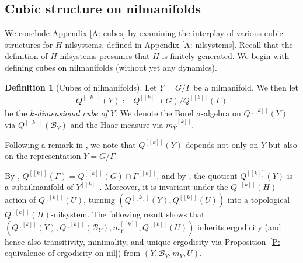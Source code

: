 \documentclass[11pt]{amsart}
\theoremstyle{definition}
\newtheorem{definition}[lemma]{Definition}
\newcommand{\CB}{{\mathcal B}}
\newcommand{\cube}[1]{{[\![#1]\!]}}
\newcommand{\1}{{\mathbf{1}}}
\begin{document}
\subsection{Cubic structure on nilmanifolds}
We conclude Appendix \ref{A: cubes} by examining the interplay of various cubic structures for $H$-nilsystems, defined in Appendix \ref{A: nilsystems}. Recall that the definition of $H$-nilsystems presumes that $H$ is finitely generated. We begin with defining cubes on nilmanifolds (without yet any dynamics).
\begin{definition}[Cubes of nilmanifolds]\label{D: cubes of nilmanifolds}
    Let $Y=G/\Gamma$ be a nilmanifold. 
    We then let
     \begin{align*}
    Q^{\cube{k}}(Y):=Q^{\cube{k}}(G)/Q^{\cube{k}}(\Gamma)    
    \end{align*}
     be the \textit{$k$-dimensional cube of $Y$}. We denote the Borel $\sigma$-algebra on $Q^\cube{k}(Y)$ via $Q^\cube{k}(\CB_Y)$
     and the Haar measure via $m_Y^{\cube{k}}$.  
\end{definition}

Following a remark in \cite{HK18}, we note that $Q^\cube{k}(Y)$ depends not only on $Y$ but also on the representation $Y=G/\Gamma$.


By \cite[Chapter 6, Proposition~19]{HK18}, $Q^{\cube{k}}(\Gamma) = Q^{\cube{k}}(G)\cap \Gamma^\cube{k}$, and  by \cite[Chapter 12, Theorem~2]{HK18}, the quotient $Q^{\cube{k}}(Y)$ is a subnilmanifold of $Y^\cube{k}$.
Moreover, it is invariant under the $Q^\cube{k}(H)$-action of $Q^{\cube{k}}(U)$, turning $(Q^\cube{k}(Y),Q^\cube{k}(U))$ into a topological $Q^\cube{k}(H)$-nilsystem. The following result shows that $(Q^\cube{k}(Y), Q^\cube{k}(\CB_Y), m_Y^\cube{k}, Q^\cube{k}(U))$ inherits ergodicity (and hence also transitivity, minimality, and unique ergodicity via Proposition~\ref{P: equivalence of ergodicity on nil}) from $(Y, \CB_Y, m_Y, U)$.
\end{document}
